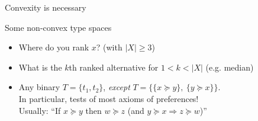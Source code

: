 \begin{frame}{Convexity is necessary}{}

%
%

\end{frame}


\begin{frame}{Some non-convex type spaces}{}

\begin{itemize}

\item Where do you rank $x$? (with $|X|\ge 3$)

\bigskip

\item What is the $k$th ranked alternative for $1<k<|X|$ (e.g. median)

\bigskip

\item Any binary $T=\{t_1,t_2\}$, \emph{except} $T=\{\{x\succeq y\},~ \{y\succeq x\}\}$.\\
In particular, tests of most axioms of preferences!\\
Usually: ``If $x\succeq y$ then $w\succeq z$ (and $y\succeq x \Rightarrow z\succeq w$)''

\end{itemize}
\end{frame}

